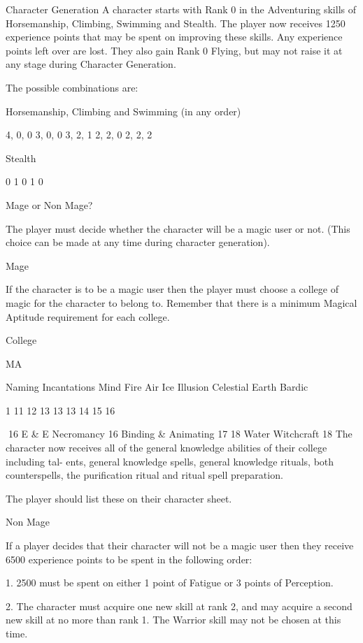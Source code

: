 \begin{Chapter}{Character Generation}
A  character  starts  with Rank 0  in the  Adventuring 
skills  of  Horsemanship,  Climbing,  Swimming  and 
Stealth.  The  player  now  receives  1250  experience 
points that may be spent on improving these skills. 
Any experience points left over are lost. They also 
gain  Rank  0  Flying,  but  may  not  raise  it  at  any 
stage during Character Generation. 

The possible combinations are: 

Horsemanship, 
Climbing and 
Swimming  
(in any order) 

4, 0, 0 
3, 0, 0 
3, 2, 1 
2, 2, 0 
2, 2, 2 

Stealth 

0 
1 
0 
1 
0 

Mage or Non Mage? 

The  player  must  decide  whether  the character  will 
be a magic user or not. (This choice can be made at 
any time during character generation). 

Mage 

If  the  character  is  to  be  a  magic  user  then  the 
player  must  choose  a  college  of  magic  for  the 
character  to  belong  to.  Remember  that  there  is  a 
minimum  Magical  Aptitude  requirement  for  each 
college. 

College  

MA 

Naming Incantations  
Mind  
Fire  
Air  
Ice  
Illusion  
Celestial  
Earth  
Bardic  

1 
11 
12 
13 
13 
13 
14 
15 
16 

16 
E \& E  
Necromancy  
16 
Binding \& Animating   17 
18 
Water  
Witchcraft  
18 
The  character  now  receives  all  of  the  general 
knowledge  abilities  of  their  college  including  tal-
ents, general knowledge spells, general knowledge 
rituals,  both  counterspells,  the  purification  ritual 
and ritual spell preparation. 

The  player  should  list  these  on  their  character 
sheet. 

Non Mage 

If a player decides that their character will not be a 
magic  user  then  they  receive  6500  experience 
points to be spent in the following order: 

1. 2500 must be spent on either 1 point of Fatigue 
or 3 points of Perception. 

2. The character must acquire one new skill at rank 
2, and  may  acquire  a  second new  skill  at  no  more 
than rank 1. The Warrior skill may not be chosen at 
this time. 


\end{Chapter}

